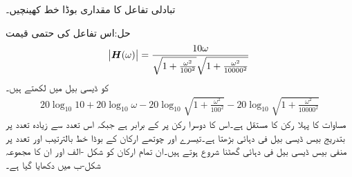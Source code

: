 تبادلی تفاعل  کا مقداری بوڈا خط کھینچیں۔

حل:اس تفاعل کی حتمی قیمت 
\begin{align*}
\abs{{{\boldsymbol{H}}}(\omega)}=\frac{10\omega}{\sqrt{1+\frac{\omega^2}{100^2}}\sqrt{1+\frac{\omega^2}{10000^2}}}
\end{align*}
کو ڈیسی بیل میں لکھتے ہیں۔
\begin{align}\label{مساوات_تعددی_چار_رکنی_بوڈا}
20\log_{10} 10 +20\log_{10}\omega -20\log_{10}\sqrt{1+\frac{\omega^2}{100^2}} -20\log_{10}\sqrt{1+\frac{\omega^2}{10000^2}}
\end{align}
مساوات  کا پہلا رکن  کا مستقل ہے۔اس کا دوسرا رکن  پر  کے برابر ہے جبکہ اس تعدد سے زیادہ تعدد پر بتدریج بیس ڈیسی بیل فی دہائی بڑھتا ہے۔تیسرے اور چوتھے ارکان کے بوڈا خط بالترتیب   اور  تعدد پر منفی بیس ڈیسی بیل فی دہائی گھٹنا شروع ہوتے ہیں۔ان تمام ارکان کو شکل -الف اور ان کا مجموعہ شکل-ب میں دکھایا گیا ہے۔
